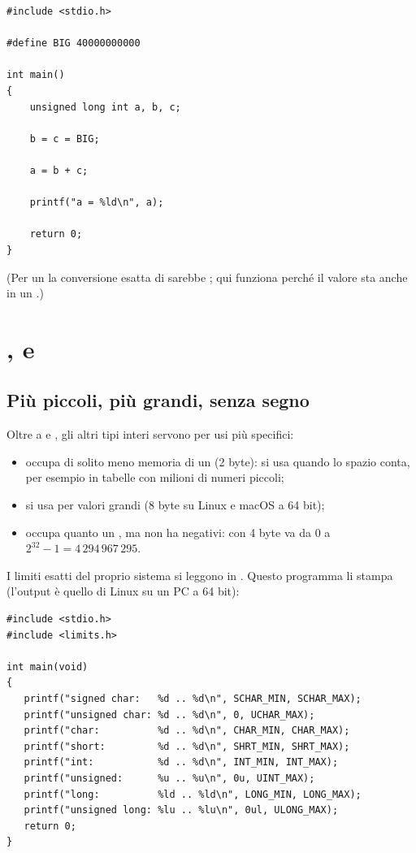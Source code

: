 \begin{affianco}[0.5][c]
\begin{lstlisting}[style=c, name=overflow.c]
#include <stdio.h>

#define BIG	40000000000

int main()
{
	unsigned long int a, b, c;

	b = c = BIG;

	a = b + c;

	printf("a = %ld\n", a);

	return 0;
}
\end{lstlisting}
\risultato
{}
(Per un  la conversione esatta di  sarebbe
; qui  funziona perché il valore sta anche in un
.)
\end{affianco}

\section{,  e }

\subsection{Più piccoli, più grandi, senza segno}

Oltre a  e , gli altri tipi interi servono per usi più
specifici:

\begin{itemize}
  \item {} occupa di solito meno memoria di un  (2
        byte): si usa quando lo spazio conta, per esempio in tabelle con
        milioni di numeri piccoli;
  \item {} si usa per valori grandi (8 byte su Linux e macOS a 64
        bit);
  \item {} occupa quanto un , ma non ha negativi: con
        4 byte va da 0 a $2^{32} - 1 = 4\,294\,967\,295$.
\end{itemize}

I limiti esatti del proprio sistema si leggono in . Questo
programma li stampa (l'output è quello di Linux su un PC a 64 bit):

\begin{lstlisting}[style=c, name=limiti.c]
#include <stdio.h>
#include <limits.h>

int main(void)
{
   printf("signed char:   %d .. %d\n", SCHAR_MIN, SCHAR_MAX);
   printf("unsigned char: %d .. %d\n", 0, UCHAR_MAX);
   printf("char:          %d .. %d\n", CHAR_MIN, CHAR_MAX);
   printf("short:         %d .. %d\n", SHRT_MIN, SHRT_MAX);
   printf("int:           %d .. %d\n", INT_MIN, INT_MAX);
   printf("unsigned:      %u .. %u\n", 0u, UINT_MAX);
   printf("long:          %ld .. %ld\n", LONG_MIN, LONG_MAX);
   printf("unsigned long: %lu .. %lu\n", 0ul, ULONG_MAX);
   return 0;
}
\end{lstlisting}

